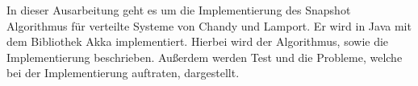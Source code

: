 In dieser Ausarbeitung geht es um die Implementierung des Snapshot Algorithmus für verteilte Systeme von Chandy und Lamport. 
Er wird in Java mit dem Bibliothek Akka implementiert.
Hierbei wird der Algorithmus, sowie die Implementierung beschrieben.
Außerdem werden Test und die Probleme, welche bei der Implementierung auftraten, dargestellt.